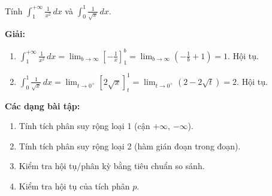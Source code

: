 \documentclass[12pt,a4paper]{article}
\begin{document}
\begin{vidu}
  Tính $\displaystyle\int_1^{+\infty} \frac{1}{x^2}\,dx$ và $\displaystyle\int_0^1 \frac{1}{\sqrt{x}}\,dx$.

  \medskip\textbf{Giải:}
  \begin{enumerate}[label=(\alph*)]
    \item $\displaystyle\int_1^{+\infty} \frac{1}{x^2}\,dx = \lim_{b\to\infty}\left[-\frac{1}{x}\right]_1^b = \lim_{b\to\infty}\left(-\frac{1}{b}+1\right) = 1$. Hội tụ.
    \item $\displaystyle\int_0^1 \frac{1}{\sqrt{x}}\,dx = \lim_{t\to 0^+}\left[2\sqrt{x}\right]_t^1 = \lim_{t\to 0^+}(2 - 2\sqrt{t}) = 2$. Hội tụ.
  \end{enumerate}
\end{vidu}

\medskip\noindent\textbf{Các dạng bài tập:}
\begin{enumerate}[label=\textbf{Dạng \arabic*:}, leftmargin=*, align=left]
  \item Tính tích phân suy rộng loại 1 (cận $+\infty$, $-\infty$).
  \item Tính tích phân suy rộng loại 2 (hàm gián đoạn trong đoạn).
  \item Kiểm tra hội tụ/phân kỳ bằng tiêu chuẩn so sánh.
  \item Kiểm tra hội tụ của tích phân $p$.
\end{enumerate}
\end{document}
